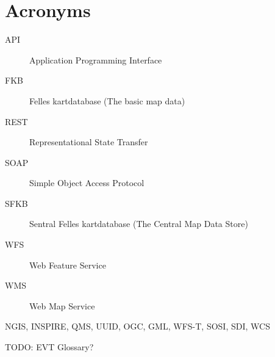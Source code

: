 
\chapter{Acronyms}
\begin{description}
	\item[API] Application Programming Interface
	\item[FKB] Felles kartdatabase (The basic map data)
	\item[REST] Representational State Transfer 
	\item[SOAP] Simple Object Access Protocol
	\item[SFKB] Sentral Felles kartdatabase (The Central Map Data Store)
	\item[WFS] Web Feature Service
	\item[WMS] Web Map Service
\end{description}

NGIS, INSPIRE, QMS, UUID, OGC, GML, WFS-T, SOSI, SDI, WCS


TODO: EVT Glossary?